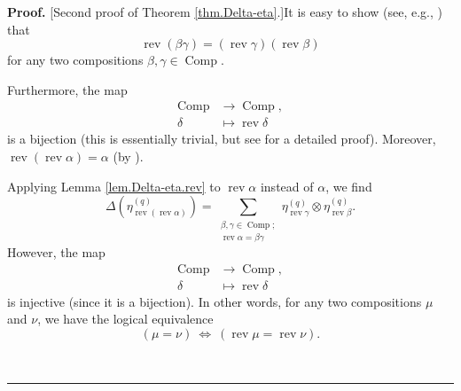 \documentclass[numbers=enddot,12pt,final,onecolumn,notitlepage]{scrartcl}%
\theoremstyle{definition}
\newenvironment{proof}[1][Proof]{\noindent\textbf{#1.} }{\ \rule{0.5em}{0.5em}}
\let\sumnonlimits\sum
\renewcommand{\sum}{\sumnonlimits\limits}
\newenvironment{verlong}{}{}
\begin{document}
\begin{verlong}
\begin{proof}
[Second proof of Theorem \ref{thm.Delta-eta}.]It is easy to show (see, e.g.,
\cite[Proposition 5.3]{comps}) that
\begin{equation}
\operatorname*{rev}\left(  \beta\gamma\right)  =\left(  \operatorname*{rev}%
\gamma\right)  \left(  \operatorname*{rev}\beta\right)
\label{pf.thm.Delta-eta.revbg}%
\end{equation}
for any two compositions $\beta,\gamma\in\operatorname*{Comp}$.

Furthermore, the map
\begin{align*}
\operatorname*{Comp}  &  \rightarrow\operatorname*{Comp},\\
\delta &  \mapsto\operatorname*{rev}\delta
\end{align*}
is a bijection (this is essentially trivial, but see \cite[Corollary
3.5]{comps} for a detailed proof). Moreover, $\operatorname*{rev}\left(
\operatorname*{rev}\alpha\right)  =\alpha$ (by \cite[Proposition 3.4]{comps}).

Applying Lemma \ref{lem.Delta-eta.rev} to $\operatorname*{rev}\alpha$ instead
of $\alpha$, we find%
\begin{equation}
\Delta\left(  \eta_{\operatorname*{rev}\left(  \operatorname*{rev}%
\alpha\right)  }^{\left(  q\right)  }\right)  =\sum_{\substack{\beta,\gamma
\in\operatorname*{Comp};\\\operatorname*{rev}\alpha=\beta\gamma}%
}\eta_{\operatorname*{rev}\gamma}^{\left(  q\right)  }\otimes\eta
_{\operatorname*{rev}\beta}^{\left(  q\right)  }. \label{pf.thm.Delta-eta.4}%
\end{equation}
However, the map%
\begin{align*}
\operatorname*{Comp}  &  \rightarrow\operatorname*{Comp},\\
\delta &  \mapsto\operatorname*{rev}\delta
\end{align*}
is injective (since it is a bijection). In other words, for any two
compositions $\mu$ and $\nu$, we have the logical equivalence%
\begin{equation}
\left(  \mu=\nu\right)  \ \Longleftrightarrow\ \left(  \operatorname*{rev}%
\mu=\operatorname*{rev}\nu\right)  . \label{pf.thm.Delta-eta.revinj}%
\end{equation}



\end{proof}
\end{verlong}
\end{document}
